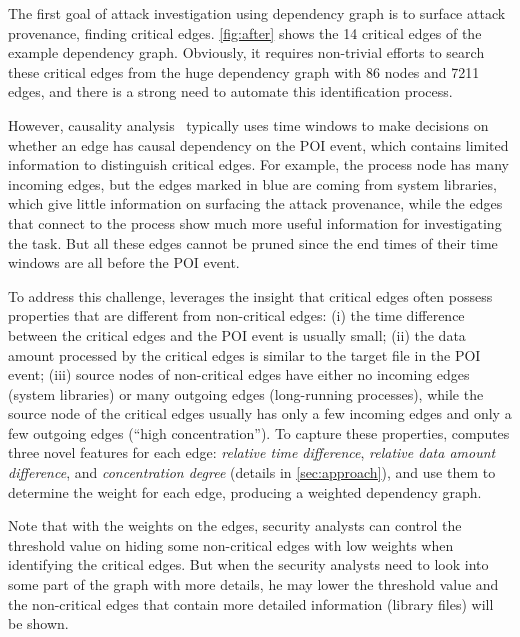The first goal of attack investigation using dependency graph is to surface attack provenance, \ie finding critical edges.
\cref{fig:after} shows the 14 critical edges of the example dependency graph.
Obviously, it requires non-trivial efforts to search these critical edges from the huge dependency graph with 86 nodes and 7211 edges, and there is a strong need to automate this identification process.

However, causality analysis~\cite{backtracking,backtracking2} typically uses time windows to make decisions on whether an edge has causal dependency on the POI event, which contains limited information to distinguish critical edges.
For example, the  process node has many incoming edges, but the edges marked in blue are coming from system libraries, which give little information on surfacing the attack provenance, while the edges that connect to the process  show much more useful information for investigating the task.
But all these edges cannot be pruned since the end times of their time windows are all before the POI event. 

To address this challenge, \tool leverages the insight that critical edges often possess properties that are different from non-critical edges: (i) the time difference between the critical edges and the POI event is usually small;
(ii) the data amount processed by the critical edges is similar to the target file in the POI event;
(iii) source nodes of non-critical edges have either no incoming edges (\eg system libraries) or many outgoing edges (\eg long-running processes), while the source node of the critical edges usually has only a few incoming edges and only a few outgoing edges (\ie ``high concentration'').
To capture these properties, \tool computes three novel features for each edge: \emph{relative time difference}, \emph{relative data amount difference}, and \emph{concentration degree} (details in \cref{sec:approach}), and use them to determine the weight for each edge, producing a weighted dependency graph.

Note that with the weights on the edges, security analysts can control the threshold value on hiding some non-critical edges with low weights when identifying the critical edges.
But when the security analysts need to look into some part of the graph with more details,
he may lower the threshold value and the non-critical edges that contain more detailed information (\eg library files) will be shown.

